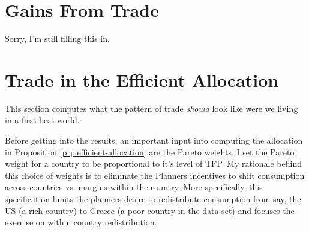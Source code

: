 \documentclass[12pt,pdftex]{article}
\begin{document}
\begin{onehalfspacing}





\section{Gains From Trade}

Sorry, I'm still filling this in.

\section{Trade in the Efficient Allocation}

This section computes what the pattern of trade \emph{should} look like were we living in a first-best world.

\begin{figure}[!t]
\caption{}\label{fig:planner-trade}
\end{figure}

Before getting into the results, an important input into computing the allocation in Proposition \ref{prp:efficient-allocation} are the Pareto weights. I set the Pareto weight for a country to be proportional to it's level of TFP. My rationale behind this choice of weights is to eliminate the Planners incentives to shift consumption across countries vs. margins within the country. More specifically, this specification limits the planners desire to redistribute consumption from say, the US (a rich country) to Greece (a poor country in the data set) and focuses the exercise on within country redistribution.


\end{onehalfspacing}
\end{document}

